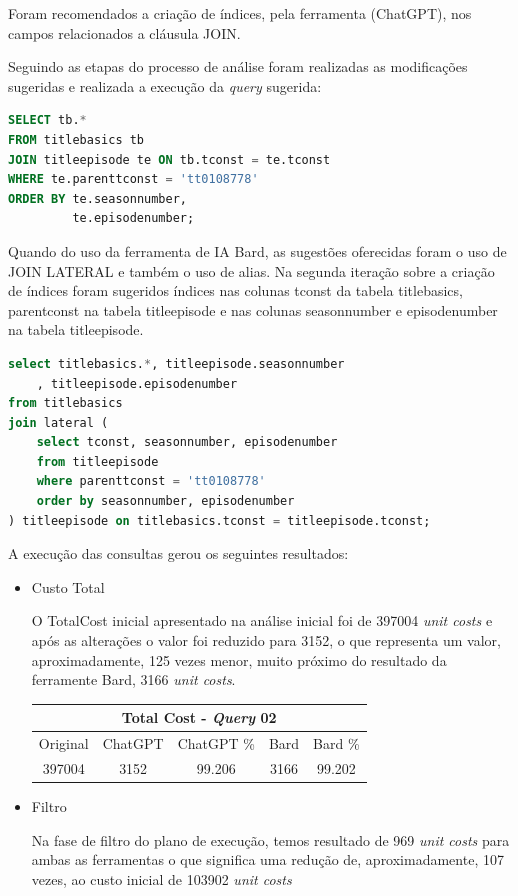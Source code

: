\documentclass[12pt]{article}
\begin{document}
Foram recomendados a criação de índices, pela ferramenta (ChatGPT), nos campos relacionados a cláusula JOIN.

Seguindo as etapas do processo de análise foram realizadas as modificações sugeridas e realizada a execução da \emph{query} sugerida:

\begin{lstlisting}[language=SQL, caption=Query 02 - ChatGPT]
SELECT tb.*
FROM titlebasics tb
JOIN titleepisode te ON tb.tconst = te.tconst
WHERE te.parenttconst = 'tt0108778'
ORDER BY te.seasonnumber,
         te.episodenumber;
\end{lstlisting}

Quando do uso da ferramenta de IA Bard, as sugestões oferecidas foram o uso de JOIN LATERAL e também o uso de alias.
Na segunda iteração sobre a criação de índices foram sugeridos índices nas colunas tconst da tabela titlebasics, parentconst na tabela titleepisode e nas colunas seasonnumber e episodenumber na tabela titleepisode.

\begin{lstlisting}[language=SQL, caption=Query 02 - Bard]
select titlebasics.*, titleepisode.seasonnumber
    , titleepisode.episodenumber
from titlebasics
join lateral (
    select tconst, seasonnumber, episodenumber
    from titleepisode
    where parenttconst = 'tt0108778'
    order by seasonnumber, episodenumber
) titleepisode on titlebasics.tconst = titleepisode.tconst;
\end{lstlisting}

A execução das consultas gerou os seguintes resultados:

\begin{itemize}

\item{Custo Total}

O TotalCost inicial apresentado na análise inicial foi de 397004 \emph{unit costs} e após as alterações o valor foi reduzido para 3152, o que representa um valor, aproximadamente, 125 vezes menor, muito próximo do resultado da ferramente Bard, 3166 \emph{unit costs}.

\begin{center}
\begin{tabular}{ |c|c|c|c|c| } 
 \hline
 \multicolumn{5}{|c|}{Total Cost - \emph{Query} 02} \\
 \hline
 Original & ChatGPT & ChatGPT \% & Bard & Bard \% \\ [0.5ex] 
 \hline
 397004 & 3152 & 99.206 & 3166 & 99.202 \\ 
 \hline
\end{tabular}
\end{center}

\item{Filtro}

Na fase de filtro do plano de execução, temos resultado de 969 \emph{unit costs} para ambas as ferramentas o que significa uma redução de, aproximadamente, 107 vezes, ao custo inicial de 103902 \emph{unit costs} 
\end{itemize}
\end{document}
